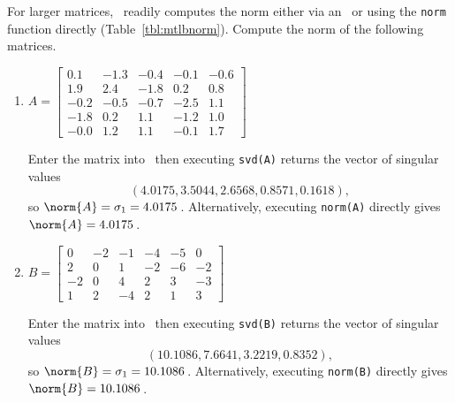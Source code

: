 \begin{example} \label{eg:}
For larger matrices, \script\ readily computes the norm either via an \svd\ or using the \verb|norm| function directly (Table~\ref{tbl:mtlbnorm}).
Compute the norm of the following matrices.
\begin{enumerate}
\item \(A=\begin{bmatrix} 
   0.1&-1.3&-0.4&-0.1&-0.6\\
   1.9&2.4&-1.8&0.2&0.8\\
  -0.2&-0.5&-0.7&-2.5&1.1\\
  -1.8&0.2&1.1&-1.2&1.0\\
  -0.0&1.2&1.1&-0.1&1.7
 \end{bmatrix}\)
\begin{solution} 
Enter the matrix into \script\ then executing \verb|svd(A)| returns the vector of singular values
\setbox\ajrqrbox\hbox{}%
\marginpar{\usebox{\ajrqrbox\\[2ex]}}%
\begin{equation*}
(4.0175,3.5044,2.6568,0.8571,0.1618),
\end{equation*}
so \(\norm{A}=\sigma_1=4.0175\)\,.
Alternatively, executing \verb|norm(A)| directly gives  \(\norm{A}=4.0175\)\,.
\end{solution}

\item \(B=\begin{bmatrix} 
0&-2&-1&-4&-5&0
\\2&0&1&-2&-6&-2
\\-2&0&4&2&3&-3
\\1&2&-4&2&1&3
\end{bmatrix}\)
\begin{solution} 
Enter the matrix into \script\ then executing \verb|svd(B)| returns the vector of singular values
\setbox\ajrqrbox\hbox{}%
\marginpar{\usebox{\ajrqrbox\\[2ex]}}%
\begin{equation*}
(10.1086,7.6641,3.2219,0.8352),
\end{equation*}
so \(\norm{B}=\sigma_1=10.1086\)\,.
Alternatively, executing \verb|norm(B)| directly gives  \(\norm{B}=10.1086\)\,.
\end{solution}

\end{enumerate}
\end{example}











